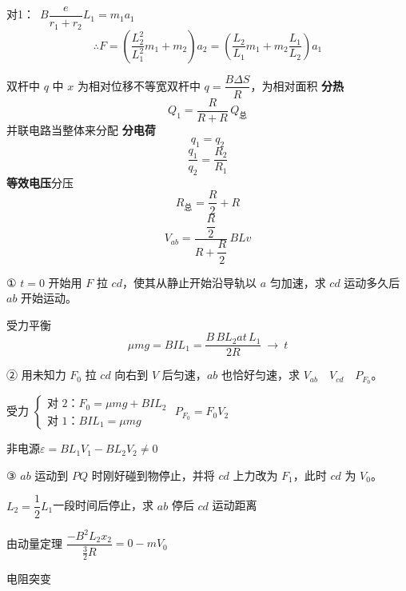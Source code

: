 对1：\ $B\dfrac{e}{r_1+r_2}L_1=m_1a_1$
\[
\therefore F=\left(\frac{L_2^2}{L_1^2}m_1+m_2\right)a_2=\left(\frac{L_2}{L_1}m_1+m_2\frac{L_1}{L_2}\right)a_1
\]

双杆中 $q$ 中 $x$ 为相对位移\quad 不等宽双杆中 $q=\dfrac{B\Delta S}{R}$，为相对面积 %
\textbf{分热}
\[ Q_1=\frac{R}{R+R}\,Q_{\text{总}} \]
并联电路当整体来分配 %
\textbf{分电荷}
\[ q_1=q_2 \]
\[ \frac{q_1}{q_2}=\frac{R_2}{R_1} \]
\textbf{等效电压}\quad 分压
\[ R_{\text{总}}=\frac{R}{2}+R \]
\[ V_{ab}=\frac{\dfrac{R}{2}}{R+\dfrac{R}{2}}\,BLv \]
\begin{problem}
① $t=0$ 开始用 $F$ 拉 $cd$，使其从静止开始沿导轨以 $a$ 匀加速，求 $cd$ 运动多久后 $ab$ 开始运动。
\begin{solution}
受力平衡 %
\[ \mu mg=BIL_1=\frac{B\,BL_2at\,L_1}{2R}\ \to\ t \]
\end{solution}
② 用未知力 $F_0$ 拉 $cd$ 向右到 $V$ 后匀速，$ab$ 也恰好匀速，求 $V_{ab}$　$V_{cd}$　$P_{F_0}$。
\begin{solution}
受力 $\left\{\begin{array}{l}\text{对 2：}F_0=\mu mg+BIL_2\\ \text{对 1：}BIL_1=\mu mg\end{array}\right.$ \qquad $P_{F_0}=F_0V_2$

非电源\quad $\varepsilon=BL_1V_1-BL_2V_2\neq 0$ %
\end{solution}
③ $ab$ 运动到 $PQ$ 时刚好碰到物停止，并将 $cd$ 上力改为 $F_1$，此时 $cd$ 为 $V_0$。

$L_2=\dfrac{1}{2}L_1$\qquad 一段时间后停止，求 $ab$ 停后 $cd$ 运动距离
\begin{solution}
由动量定理 \quad $\dfrac{-B^2L_2x_2}{\frac{3}{2}R}=0-mV_0$

电阻突变
\end{solution}
\end{problem}
